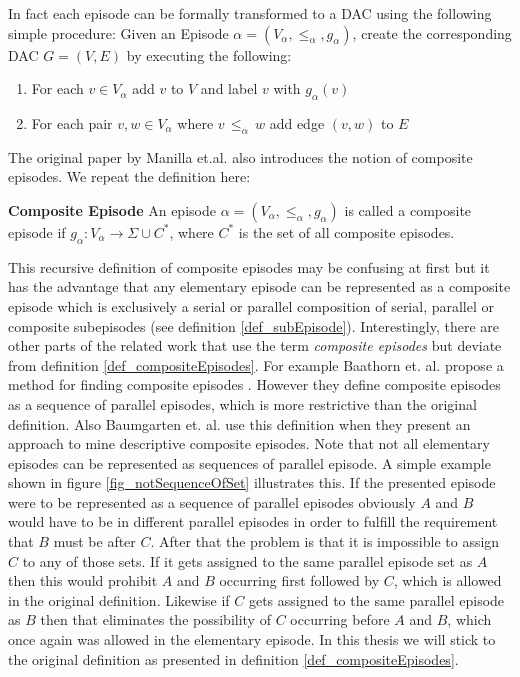 In fact each episode can be formally transformed to a DAC using the following simple procedure: Given an Episode $\alpha = (V_\alpha,{\leq}_{\alpha},g_\alpha)$, create the corresponding DAC $G = (V,E)$ by executing the following:

\begin{enumerate}
	\item For each $v \in V_\alpha$ add $v$ to $V$ and label $v$ with $g_\alpha (v)$
	\item For each pair $v,w \in V_\alpha$ where $v \, {\leq}_{\alpha} \, w $ add edge $(v,w)$ to $E$
\end{enumerate}

The original paper by Manilla et.al. \cite{mannila1995discovering} also introduces the notion of composite episodes. We repeat the definition here:

\begin{mydef}
\label{def_compositeEpisodes}
\textbf{Composite Episode} An episode $\alpha = (V_\alpha,{\leq}_{\alpha},g_\alpha)$ is called a composite episode if $g_\alpha : V_\alpha \rightarrow \Sigma \cup C^*$, where $C^*$ is the set of all composite episodes.
\end{mydef}

This recursive definition of composite episodes may be confusing at first but it has the advantage that any elementary episode can be represented as a composite episode which is exclusively a serial or parallel composition of serial, parallel or composite subepisodes (see definition \ref{def_subEpisode}). \newline
Interestingly, there are other parts of the related work that use the term \textit{composite episodes} but deviate from definition \ref{def_compositeEpisodes}. For example Baathorn et. al. propose a method for finding composite episodes \cite{bathoorn2007finding}. However they define composite episodes as a sequence of parallel episodes, which is more restrictive than the original definition. Also Baumgarten et. al. use this definition \cite{baumgarten2003tree} when they present an approach to mine descriptive composite episodes. Note that not all elementary episodes can be represented as sequences of parallel episode. A simple example shown in figure \ref{fig_notSequenceOfSet} illustrates this. If the presented episode were to be represented as a sequence of parallel episodes obviously $A$ and $B$ would have to be in different parallel episodes in order to fulfill the requirement that $B$ must be after $C$. After that the problem is that it is impossible to assign $C$ to any of those sets. If it gets assigned to the same parallel episode set as $A$ then this would prohibit $A$ and $B$ occurring first followed by $C$, which is allowed in the original definition. Likewise if $C$ gets assigned to the same parallel episode as $B$ then that eliminates the possibility of $C$ occurring before $A$ and $B$, which once again was allowed in the elementary episode. In this thesis we will stick to the original definition as presented in definition \ref{def_compositeEpisodes}. \newline

